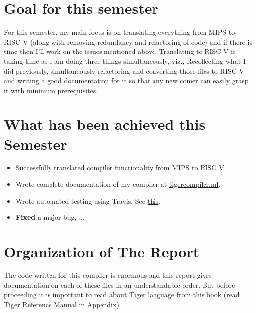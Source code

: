 \section{Goal for this semester}

For this semester, my main focus is on translating everything from MIPS to RISC V (along with removing redundancy and refactoring of code) and if there is time then I'll work on the issues mentioned above. Translating to RISC V is taking time as I am doing three things simultaneously, viz., Recollecting what I did previously, simultaneously refactoring and converting those files to RISC V and writing a good documentation for it so that any new comer can easily grasp it with minimum prerequisites. 

\section{What has been achieved this Semester}

\begin{itemize}
  \item Successfully translated compiler functionality from MIPS to RISC V. 

  \item Wrote complete documentation of my compiler at \href{https://tigercompiler.ml}{tigercompiler.ml}.

  \item Wrote automated testing using Travis. See \href{https://travis-ci.org/sourabh2311/btp}{this}.

  \item \textbf{Fixed} a major bug, ...
  
\end{itemize}

\section{Organization of The Report}

The code written for this compiler is enormous and this report gives documentation on each of these files in an understandable order. But before proceeding it is important to read about Tiger language from \href{https://www.cs.princeton.edu/~appel/modern/ml/}{this book} (read Tiger Reference Manual in Appendix). 

